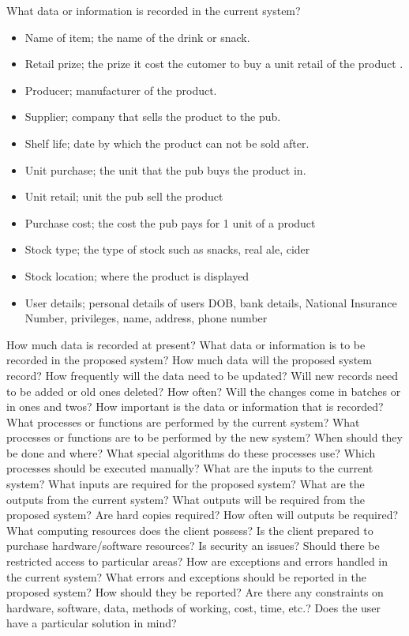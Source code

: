What data or information is recorded in the current system?
\begin{itemize}
	\item Name of item; the name of the drink or snack.
	\item Retail prize; the prize it cost the cutomer to buy a unit retail of the product .
	\item Producer; manufacturer of the product.
	\item Supplier; company that sells the product to the pub.
	\item Shelf life; date by which the product can not be sold after.
	\item Unit purchase; the unit that the pub buys the product in. 
	\item Unit retail; unit the pub sell the product
	\item Purchase cost; the cost the pub pays for 1 unit of a product
	\item Stock type; the type of stock such as snacks, real ale, cider
	\item Stock location; where the product is displayed
	\item User details; personal details of users DOB, bank details, National Insurance Number, privileges, name, address, phone number
\end{itemize}

How much data is recorded at present?
What data or information is to be recorded in the proposed system? How much data will the proposed system record?
How frequently will the data need to be updated?
Will new records need to be added or old ones deleted? How often?
Will the changes come in batches or in ones and twos?
How important is the data or information that is recorded?
What processes or functions are performed by the current system?
What processes or functions are to be performed by the new system?
When should they be done and where?
What special algorithms do these processes use?
Which processes should be executed manually?
What are the inputs to the current system?
What inputs are required for the proposed system?
What are the outputs from the current system?
What outputs will be required from the proposed system?
Are hard copies required?
How often will outputs be required?
What computing resources does the client possess?
Is the client prepared to purchase hardware/software resources?
Is security an issues?
Should there be restricted access to particular areas?
How are exceptions and errors handled in the current system?
What errors and exceptions should be reported in the proposed system?
How should they be reported?
Are there any constraints on hardware, software, data, methods of working, cost, time, etc.?
Does the user have a particular solution in mind?


